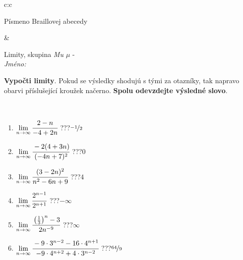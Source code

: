 \documentclass[10pt]{report}
\begin{document}
\begin{tabular}{c:c}
\begin{minipage}[c][104.5mm][t]{0.5\linewidth}
\begin{center}
\begin{minipage}{0.20\linewidth}
\begin{center}
{\small Písmeno Braillovej abecedy}
\end{center}
\end{minipage}
\end{center}
\end{minipage}
&
\begin{minipage}[c][104.5mm][t]{0.5\linewidth}
\begin{center}
\vspace{7mm}
{\huge Limity, skupina \textit{Mu $\mu$} -}\\[5mm]
\textit{Jméno:}\phantom{xxxxxxxxxxxxxxxxxxxxxxxxxxxxxxxxxxxxxxxxxxxxxxxxxxxxxxxxxxxxxxxxx}\\[5mm]
\begin{minipage}{0.95\linewidth}
\begin{center}
\textbf{Vypočti limity}. Pokud se výsledky shodujú s tými za otazníky, tak napravo\\obarvi příslušející kroužek načerno. \textbf{Spolu odevzdejte výsledné slovo}.
\end{center}
\end{minipage}
\\[1mm]
\begin{minipage}{0.79\linewidth}
\begin{center}
\begin{varwidth}{\linewidth}
\begin{enumerate}
\normalsize
\item $\lim\limits_{n\to\infty}\cfrac{2-n}{-4+2n}$\quad \dotfill\; ???\;\dotfill \quad $\nicefrac{-1}{2}$
\item $\lim\limits_{n\to\infty}\cfrac{-2(4+3n)}{(-4n+7)^2}$\quad \dotfill\; ???\;\dotfill \quad $0$
\item $\lim\limits_{n\to\infty}\cfrac{(3-2n)^2}{n^2-6n+9}$\quad \dotfill\; ???\;\dotfill \quad $4$
\item $\lim\limits_{n\to\infty}\cfrac{2^{n-1}}{2^{n+1}}$\quad \dotfill\; ???\;\dotfill \quad $-\infty$
\item $\lim\limits_{n\to\infty}\cfrac{\left(\frac{1}{3}\right)^n -3}{2n^{-9}}$\quad \dotfill\; ???\;\dotfill \quad $\infty$
\item $\lim\limits_{n\to\infty}\cfrac{-9\cdot 3^{n-2}-16\cdot 4^{n+1}}{-9\cdot 4^{n+2}+4\cdot 3^{n-2}}$\quad \dotfill\; ???\;\dotfill \quad $\nicefrac{64}{9}$
\end{enumerate}
\end{varwidth}
\end{center}
\end{minipage}
\begin{minipage}{0.20\linewidth}

\end{minipage}
\end{center}
\end{minipage}
\end{tabular}
\end{document}
